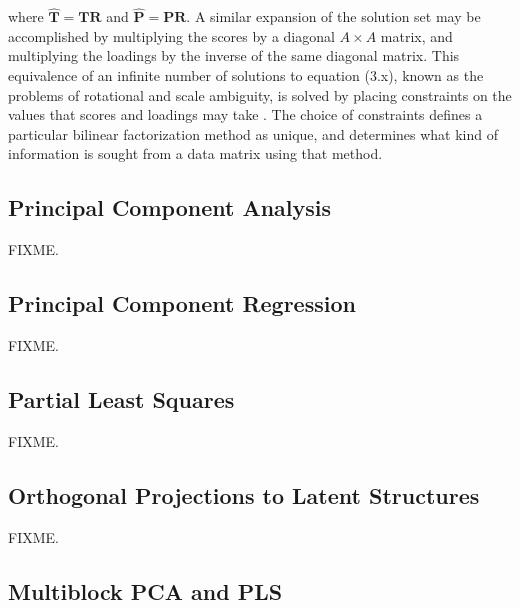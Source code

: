 \begin{doublespace}
where $\hat{\mathbf{T}} = \mathbf{T} \mathbf{R}$ and
$\hat{\mathbf{P}} = \mathbf{P} \mathbf{R}$. A similar expansion of the solution
set may be accomplished by multiplying the scores by a diagonal $A \times A$
matrix, and multiplying the loadings by the inverse of the same diagonal
matrix. This equivalence of an infinite number of solutions to equation (3.x),
known as the problems of rotational and scale ambiguity, is solved by placing
constraints on the values that scores and loadings may take
\cite{dejuan:aca1997,jolliffe2002}. The choice of constraints defines a
particular bilinear factorization method as unique, and determines what
kind of information is sought from a data matrix using that method.
\end{doublespace}

\subsection{Principal Component Analysis}

\begin{doublespace}
FIXME.
\end{doublespace}

\subsection{Principal Component Regression}

\begin{doublespace}
FIXME.
\end{doublespace}

\subsection{Partial Least Squares}

\begin{doublespace}
FIXME.
\end{doublespace}

\subsection{Orthogonal Projections to Latent Structures}

\begin{doublespace}
FIXME.
\end{doublespace}

\subsection{Multiblock PCA and PLS}


